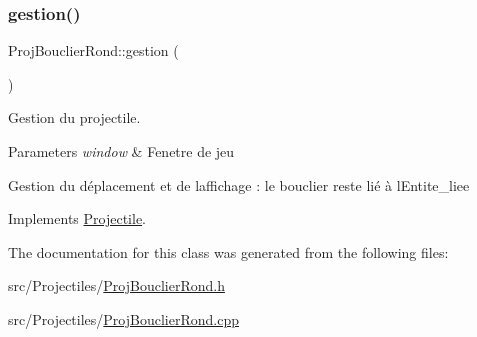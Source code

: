 \subsubsection{\texorpdfstring{gestion()}{gestion()}}
{\footnotesize\ttfamily Proj\+Bouclier\+Rond\+::gestion (\begin{DoxyParamCaption}{ }\end{DoxyParamCaption})\hspace{0.3cm}{\ttfamily [virtual]}}



Gestion du projectile. 


\begin{DoxyParams}{Parameters}
{\em window} & Fenetre de jeu\\
\hline
\end{DoxyParams}
Gestion du déplacement et de l\textquotesingle{}affichage \+: le bouclier reste lié à l\textquotesingle{}Entite\+\_\+liee 

Implements \mbox{\hyperlink{class_projectile_ad8fae955389ff8944830e9d80e0f1ce1}{Projectile}}.



The documentation for this class was generated from the following files\+:\begin{DoxyCompactItemize}
\item 
src/\+Projectiles/\mbox{\hyperlink{_proj_bouclier_rond_8h}{Proj\+Bouclier\+Rond.\+h}}\item 
src/\+Projectiles/\mbox{\hyperlink{_proj_bouclier_rond_8cpp}{Proj\+Bouclier\+Rond.\+cpp}}\end{DoxyCompactItemize}
